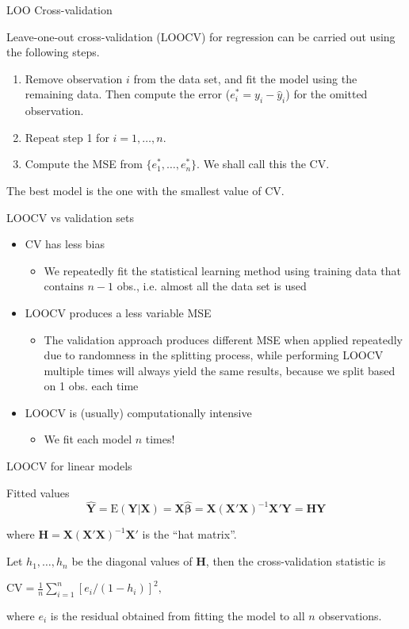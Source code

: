 \documentclass[14pt]{beamer}
\makeatletter
\def\ben{\begin{enumerate}[<+-| alert@+>]}
\def\een{\end{enumerate}}
\makeatother
\begin{document}
\begin{frame}{LOO Cross-validation}

Leave-one-out cross-validation (LOOCV) for regression can be carried out using the following steps.
\ben
\item Remove observation $i$ from the data set, and fit the model using the remaining data. Then compute the error ($e_i^*=y_i-\hat{y}_i$) for the omitted observation.
\item Repeat step 1 for $i=1,\dots,n$.
\item Compute the MSE from $\{e_1^*,\dots,e_n^*\}$. We shall call this the CV.
\een\pause
The best model is the one with the smallest value of CV.
\end{frame}


\begin{frame}{LOOCV vs validation sets}
\begin{itemize}
\item CV has less bias
\begin{itemize}
\item We repeatedly fit the statistical learning method using training data
that contains $n-1$ obs., i.e. almost all the data set is used
\end{itemize}
\item LOOCV produces a less variable MSE
\begin{itemize}
\item The validation approach produces different MSE when applied
repeatedly due to randomness in the splitting process, while
performing LOOCV multiple times will always yield the same
results, because we split based on 1 obs. each time
\end{itemize}
\item LOOCV is (usually) computationally intensive
\begin{itemize}
\item We fit each model $n$ times! 
\end{itemize}
\end{itemize}
\end{frame}

\begin{frame}{LOOCV for linear models}


\begin{block}{Fitted values}\vspace*{-0.2cm}
\[
\hat{\bm{Y}} =
\text{E}(\bm{Y}|\bm{X}) =
\bm{X}\hat{\bm{\beta}} = \bm{X}(\bm{X}'\bm{X})^{-1}\bm{X}'\bm{Y} = \bm{H}\bm{Y}
\]
\end{block}
where $\bm{H} = \bm{X}(\bm{X}'\bm{X})^{-1}\bm{X}'$ is the ``hat matrix''.\pause


Let $h_1,\dots,h_n$ be the diagonal values of $\bm{H}$, then the cross-validation statistic is
\begin{block}{}
\centerline{$\displaystyle
\text{CV} = \frac1n\sum_{i=1}^n[e_i/(1-h_i)]^2,$}
\end{block}
where $e_i$ is the residual obtained from fitting the model to all $n$ observations.


\end{frame}
\end{document}
